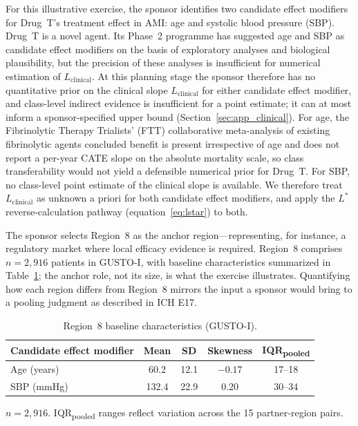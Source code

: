 \documentclass[AMA,Times1COL]{WileyNJDv5}
\begin{document}
For this illustrative exercise, the sponsor identifies two candidate effect modifiers for Drug~T's treatment effect in AMI: age and systolic blood pressure (SBP). Drug~T is a novel agent. Its Phase~2 programme has suggested age and SBP as candidate effect modifiers on the basis of exploratory analyses and biological plausibility, but the precision of these analyses is insufficient for numerical estimation of $L_{\text{clinical}}$. At this planning stage the sponsor therefore has no quantitative prior on the clinical slope $L_{\text{clinical}}$ for either candidate effect modifier, and class-level indirect evidence is insufficient for a point estimate; it can at most inform a sponsor-specified upper bound (Section~\ref{sec:app_clinical}). For age, the Fibrinolytic Therapy Trialists' (FTT) collaborative meta-analysis of existing fibrinolytic agents\cite{ftt1994} concluded benefit is present irrespective of age and does not report a per-year CATE slope on the absolute mortality scale, so class transferability would not yield a defensible numerical prior for Drug~T. For SBP, no class-level point estimate of the clinical slope is available. We therefore treat $L_{\text{clinical}}$ as unknown a priori for both candidate effect modifiers, and apply the $L^*$ reverse-calculation pathway (equation~\ref{eq:lstar}) to both.

The sponsor selects Region~8 as the anchor region---representing, for instance, a regulatory market where local efficacy evidence is required. Region~8 comprises $n = 2{,}916$ patients in GUSTO-I, with baseline characteristics summarized in Table~\ref{tab:gusto_r8}; the anchor role, not its size, is what the exercise illustrates. Quantifying how each region differs from Region~8 mirrors the input a sponsor would bring to a pooling judgment as described in ICH E17.\cite{iche17}

\begin{table}[ht]
\centering
\caption{Region~8 baseline characteristics (GUSTO-I).\label{tab:gusto_r8}}
\begin{tabular}{lcccc}
\toprule
\textbf{Candidate effect modifier} & \textbf{Mean} & \textbf{SD} & \textbf{Skewness} & \textbf{IQR\textsubscript{pooled}} \\
\midrule
Age (years) & 60.2 & 12.1 & $-0.17$ & 17--18 \\
SBP (mmHg) & 132.4 & 22.9 & 0.20 & 30--34 \\
\bottomrule
\end{tabular}
\begin{tablenotes}
\item $n = 2{,}916$. IQR\textsubscript{pooled} ranges reflect variation across the 15 partner-region pairs.
\end{tablenotes}
\end{table}
\end{document}

